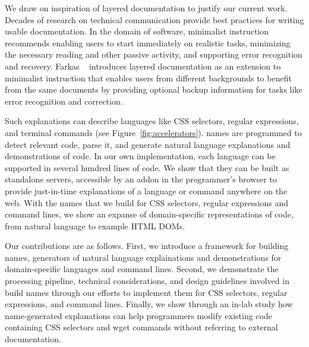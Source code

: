 We draw on inspiration of layered documentation to justify our current work. 
Decades of research on technical communication provide best practices for writing usable documentation.
In the domain of software, minimalist instruction~\cite{carroll_nurnberg_1990} recommends enabling users to start immediately on realistic tasks, minimizing the necessary  reading and other passive activity, and supporting error recognition and recovery.
Farkas ~\cite{farkas_layering_1998} introduces layered documentation as an extension to minimalist instruction that enables users from different backgrounds to benefit from the same documents by providing optional backup information for tasks like error recognition and correction.
\fi 

Such explanations can describe languages like CSS selectors, regular expressions, and terminal commands (see Figure~\ref{fig:accelerators}).
\Glspl{name} are programmed to detect relevant code, parse it, and generate natural language explanations and demonstrations of code. 
In our own implementation, each language can be supported in several hundred lines of code.
We show that they can be built as standalone servers, accessible by an addon in the programmer's browser to provide just-in-time explanations of a language or command anywhere on the web.
With the \glspl{name} that we build for CSS selectors, regular expressions and command lines, we show an expanse of domain-specific representations of code, from natural language to example HTML DOMs.

Our contributions are as follows.
First, we introduce a framework for building \Glspl{name}, generators of natural language explainations and demonstrations for domain-specific languages and command lines.
Second, we demonstrate the processing pipeline, technical considerations, and design guidelines involved in build \glspl{name} through our efforts to implement them for CSS selectors, regular expressions, and command lines.
Finally, we show through an in-lab study how \gls{name}-generated explanations can help programmers modify existing code containing CSS selectors and wget commands without referring to external documentation.